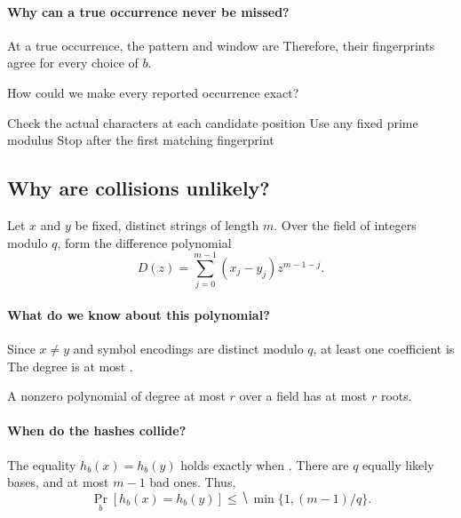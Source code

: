 \documentclass[11pt]{article}
\begin{document}
\paragraph{Why can a true occurrence never be missed?}
At a true occurrence, the pattern and window are 
Therefore, their fingerprints agree for every choice of $b$.

\begin{Qu}
    How could we make every reported occurrence exact?
    \begin{itemize}
        \aitem Check the actual characters at each candidate position
        \bitem Use any fixed prime modulus
        \citem Stop after the first matching fingerprint
    \end{itemize}
\end{Qu}

\newpage
\subsection*{Why are collisions unlikely?}
Let $x$ and $y$ be fixed, distinct strings of length $m$. Over the field of
integers modulo $q$, form the difference polynomial
\begin{equation*}
    D(z)=\sum_{j=0}^{m-1}(x_j-y_j)z^{m-1-j}.
\end{equation*}

\paragraph{What do we know about this polynomial?}
Since $x\neq y$ and symbol encodings are distinct modulo $q$, at least one
coefficient is  The degree is at most .

\begin{lemma}
    A nonzero polynomial of degree at most $r$ over a field has at most $r$
    roots.
\end{lemma}

\paragraph{When do the hashes collide?}
The equality $h_b(x)=h_b(y)$ holds exactly when .
There are $q$ equally likely bases, and at most $m-1$ bad ones. Thus,
\begin{equation*}
    \Pr_b[h_b(x)=h_b(y)]\leq\hide{\min\{1,(m-1)/q\}}.
\end{equation*}
\end{document}
